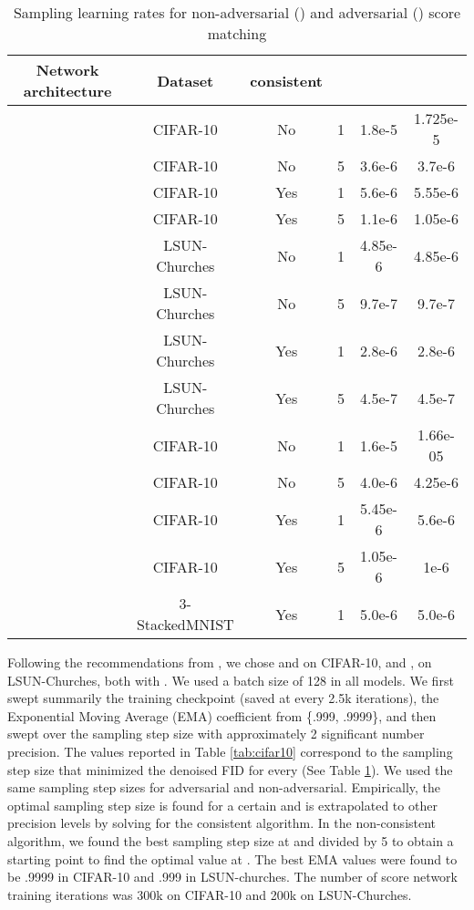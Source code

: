 \documentclass{article} \usepackage{iclr2021_conference_notitle,times}
\theoremstyle{definition}
\theoremstyle{definition}
\begin{document}
\begin{table}[H]
    \caption{Sampling learning rates for non-adversarial () and adversarial () score matching}\label{tab:hyperparameters}
    \begin{center}
    \begin{tabular}{cccc|cc}
    \toprule
    Network architecture & Dataset & consistent &  &  &  \\ 
    \midrule
    \citet{song2020improved} & CIFAR-10 & No & 1 & 1.8e-5 & 1.725e-5\\
    \citet{song2020improved} & CIFAR-10 & No & 5 & 3.6e-6 & 3.7e-6\\
    \citet{song2020improved} & CIFAR-10 & Yes & 1 & 5.6e-6 & 5.55e-6\\
    \citet{song2020improved} & CIFAR-10 & Yes & 5 & 1.1e-6 & 1.05e-6\\
    \hline
    \citet{song2020improved} & LSUN-Churches & No & 1 & 4.85e-6 & 4.85e-6\\
    \citet{song2020improved} & LSUN-Churches & No & 5 & 9.7e-7 & 9.7e-7\\
    \citet{song2020improved} & LSUN-Churches & Yes & 1 & 2.8e-6 & 2.8e-6\\
    \citet{song2020improved} & LSUN-Churches & Yes & 5 & 4.5e-7 & 4.5e-7\\
    \hline
    \citet{ho2020denoising} & CIFAR-10 & No & 1 & 1.6e-5 & 1.66e-05\\
    \citet{ho2020denoising} & CIFAR-10 & No & 5 & 4.0e-6 & 4.25e-6\\
    \citet{ho2020denoising} & CIFAR-10 & Yes & 1 & 5.45e-6 & 5.6e-6\\
    \citet{ho2020denoising} & CIFAR-10 & Yes & 5 & 1.05e-6 & 1e-6\\
    \hline
    \citet{song2020improved} & 3-StackedMNIST & Yes & 1 & 5.0e-6 & 5.0e-6\\
    \bottomrule
    \end{tabular}
    \end{center}
\end{table}

Following the recommendations from \citet{song2020improved}, we chose  and  on CIFAR-10, and ,  on LSUN-Churches, both with . We used a batch size of 128 in all models. We first swept summarily the training checkpoint (saved at every 2.5k iterations), the Exponential Moving Average (EMA) coefficient from \{.999, .9999\}, and then swept over the sampling step size  with approximately 2 significant number precision. The values reported in Table \ref{tab:cifar10} correspond to the sampling step size that minimized the denoised FID for every  (See Table \ref{tab:hyperparameters}). We used the same sampling step sizes for adversarial and non-adversarial. Empirically, the optimal sampling step size is found for a certain  and is extrapolated to other precision levels by solving  for the consistent algorithm. In the non-consistent algorithm, we found the best sampling step size at  and divided by 5 to obtain a starting point to find the optimal value at . The best EMA values were found to be .9999 in CIFAR-10 and .999 in LSUN-churches. The number of score network training iterations was 300k on CIFAR-10 and 200k on LSUN-Churches.
\end{document}
